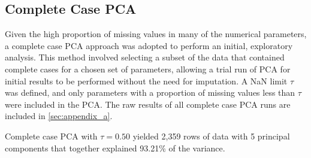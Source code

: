 \documentclass[preprint]{aastex631}
\begin{document}
\subsection{Complete Case PCA}
Given the high proportion of missing values in many of the numerical parameters, a complete case PCA approach was adopted to perform an initial, exploratory analysis. This method involved selecting a subset of the data that contained complete cases for a chosen set of parameters, allowing a trial run of PCA for initial results to be performed without the need for imputation. A NaN limit $\tau$ was defined, and only parameters with a proportion of missing values less than $\tau$ were included in the PCA. The raw results of all complete case PCA runs are included in \autoref{sec:appendix_a}.

Complete case PCA with $\tau = 0.50$ yielded 2,359 rows of data with 5 principal components that together explained 93.21\% of the variance.
\end{document}
